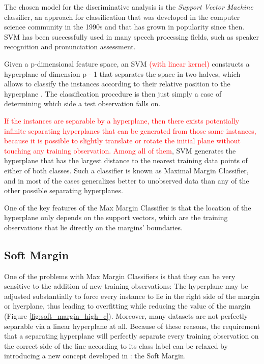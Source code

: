 
The chosen model for the discriminative analysis is the \textit{Support Vector Machine} classifier,
an approach for classification that was developed in the computer science community in the 1990s
and that has grown in popularity since then. SVM has been successfully used in many
speech processing fields, such as speaker recognition and pronunciation assessment.

Given a p-dimensional feature space, an SVM \textcolor{red}{(with linear kernel)}
constructs a hyperplane of dimension p - 1
that separates the space in two halves, which allows to classify the instances according
to their relative position to the hyperplane \cite{svm_jwht}. The classification
procedure is then just simply a case of determining which side a test observation falls on.

\textcolor{red}{
If the instances are separable by a hyperplane, then there exists potentially infinite
separating hyperplanes that can be generated from those same instances, because it
is possible to slightly translate or rotate the initial plane without touching any training
observation. Among all of them}, SVM generates the hyperplane that has the largest
distance to the nearest training data points of either of both classes. Such a classifier
is known as Maximal Margin Classifier, and in most of the cases generalizes better to
unobserved data than any of the other possible separating hyperplanes.

One of the key features of the Max Margin Classifier is that the location of the hyperplane
only depends on the support vectors, which are the training observations that lie directly
on the margins' boundaries.

\subsection{Soft Margin}

One of the problems with Max Margin Classifiers is that they can be very sensitive to the
addition of new training observations: The hyperplane may be adjusted substantially
to force every instance to lie in the right side of the margin or hyerplane, thus leading
to overfitting while reducing the value of the margin (Figure \ref{fig:soft_margin_high_c}).
Moreover, many datasets are not perfectly separable via a linear hyperplane at all.
Because of these reasons, the requirement that a separating hyperplane will perfectly separate
every training observation on the correct side of the line according to its class label can
be relaxed by introducing a new concept developed in \cite{svm_soft_margin}: the Soft Margin.

